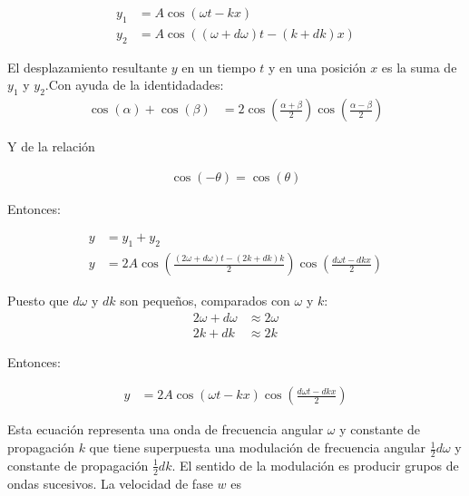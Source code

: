 \documentclass[a4paper]{article}
\begin{document}
    \begin{align}
        y_1 &= A \cos(\omega t - kx) \tag*{} \\[10pt]
        y_2 &= A \cos((\omega + d\omega) t - (k + dk)x) \tag*{}
    \end{align}

    \indent El desplazamiento resultante $y$ en un tiempo $t$ y en una posición $x$ es la suma de $y_1$ y $y_2$.Con ayuda de la identidadades: \\

    \begin{align}
        \cos(\alpha)+\cos(\beta ) &= 2 \cos(\frac{\alpha+\beta}{2})\cos{(\frac{\alpha-\beta}{2})} \tag*{}
    \end{align}

    \indent Y de la relación

    \begin{align}
        \cos(-\theta)=\cos(\theta) \tag*{}
    \end{align}

    \indent Entonces:

    \begin{align}
        y &= y_1 + y_2 \tag*{} \\[10pt]
        y &= 2A \cos(\frac{(2\omega+ d\omega)t-(2k+dk)k}{2})\cos(\frac{d\omega t-dkx}{2}) \tag*{} 
    \end{align}

    \indent Puesto que \( d\omega \) y \( dk \) son pequeños, comparados con \( \omega \) y \( k \): \\

    \begin{align}
        2\omega + d\omega &\approx 2\omega \tag*{} \\[10pt]
        2k + dk &\approx 2k \tag*{}
    \end{align}

    \indent Entonces:

    \begin{align}
        y &= 2A \cos(\omega t - kx) \cos(\frac{d\omega t - dkx}{2}) \tag*{}
    \end{align}

    \indent Esta ecuación representa una onda de frecuencia angular \( \omega \) y constante de propagación \( k \) que tiene superpuesta una modulación de frecuencia angular \( \frac{1}{2}d\omega \) y constante de propagación \( \frac{1}{2}dk \). El sentido de la modulación es producir grupos de ondas sucesivos. La velocidad de fase \( w \) es
\end{document}
